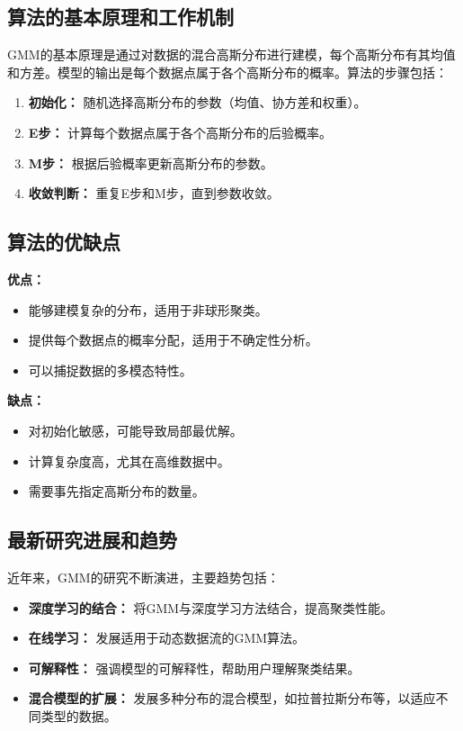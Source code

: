 \subsection*{算法的基本原理和工作机制}
GMM的基本原理是通过对数据的混合高斯分布进行建模，每个高斯分布有其均值和方差。模型的输出是每个数据点属于各个高斯分布的概率。算法的步骤包括：
\begin{enumerate}
    \item \textbf{初始化：} 随机选择高斯分布的参数（均值、协方差和权重）。
    \item \textbf{E步：} 计算每个数据点属于各个高斯分布的后验概率。
    \item \textbf{M步：} 根据后验概率更新高斯分布的参数。
    \item \textbf{收敛判断：} 重复E步和M步，直到参数收敛。
\end{enumerate}

\subsection*{算法的优缺点}
\textbf{优点：}
\begin{itemize}
    \item 能够建模复杂的分布，适用于非球形聚类。
    \item 提供每个数据点的概率分配，适用于不确定性分析。
    \item 可以捕捉数据的多模态特性。
\end{itemize}

\textbf{缺点：}
\begin{itemize}
    \item 对初始化敏感，可能导致局部最优解。
    \item 计算复杂度高，尤其在高维数据中。
    \item 需要事先指定高斯分布的数量。
\end{itemize}

\subsection*{最新研究进展和趋势}
近年来，GMM的研究不断演进，主要趋势包括：
\begin{itemize}
    \item \textbf{深度学习的结合：} 将GMM与深度学习方法结合，提高聚类性能。
    \item \textbf{在线学习：} 发展适用于动态数据流的GMM算法。
    \item \textbf{可解释性：} 强调模型的可解释性，帮助用户理解聚类结果。
    \item \textbf{混合模型的扩展：} 发展多种分布的混合模型，如拉普拉斯分布等，以适应不同类型的数据。
\end{itemize}
